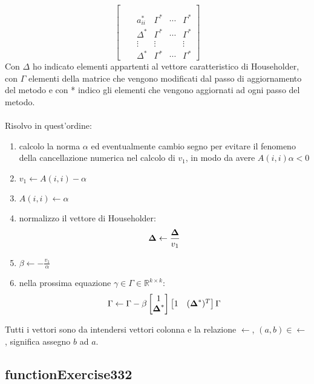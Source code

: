 \begin{oss}
\begin{displaymath}
\begin{bmatrix}
\\
\\
& & a_{ii}^{*} & \Gamma^{*} & \cdots & \Gamma^{*}   
	 \\ & & \Delta^{*} & \Gamma^{*} & \cdots & \Gamma^{*}
	 \\ & & \vdots & \vdots &  & \vdots
	 \\ & & \Delta^{*} & \Gamma^{*} & \cdots & \Gamma^{*}
\end{bmatrix}
\end{displaymath}
Con $\Delta$ ho indicato elementi appartenti al vettore caratteristico di
Householder, con $\Gamma$ elementi della matrice che vengono modificati dal
passo di aggiornamento del metodo e con * indico gli elementi che vengono
aggiornati ad ogni passo del metodo.
\\ \\
Risolvo in quest'ordine:
\begin{enumerate}
  \item calcolo la norma $\alpha$ ed eventualmente cambio segno per evitare
  	il fenomeno della cancellazione numerica nel calcolo di $v_{1}$, in modo da 
  	avere $A(i, i)\alpha < 0$
  \item $v_{1} \leftarrow A(i, i) - \alpha$
  \item $A(i, i) \leftarrow \alpha$
  \item normalizzo il vettore di Householder:
  	\begin{displaymath}\boldsymbol{\Delta} \leftarrow
  		\frac{\boldsymbol{\Delta}}{v_{1}}
	\end{displaymath}
  \item $\beta \leftarrow -\frac{v_{1}}{\alpha}$
  \item nella prossima equazione $\gamma \in \Gamma \in \mathbb{R}^{k \times
  k}$:
  \begin{displaymath}
	  \Gamma \leftarrow \Gamma - \beta %
	  \begin{bmatrix}
	  	1 \\
	  	\vect{\Delta}^{*}
	  \end{bmatrix} %
	   \begin{bmatrix}
	  	1 &
	  	(\vect{\Delta}^{*})^{T}
	  \end{bmatrix} \Gamma
  \end{displaymath}
\end{enumerate}
Tutti i vettori sono da intendersi vettori colonna e la relazione $\leftarrow$,
$(a, b) \in \leftarrow$, significa assegno $b$ ad $a$.
\end{oss}




\subsection{functionExercise332}
\label{subsection:functionExercise332}
